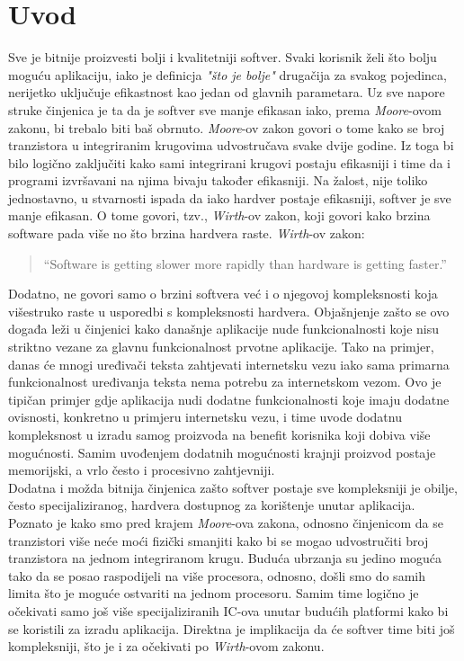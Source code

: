 \chapter{Uvod}

Sve je bitnije proizvesti bolji i kvalitetniji softver. Svaki korisnik želi što bolju moguću aplikaciju, iako je definicja \textit{"što je bolje"} drugačija za svakog pojedinca, nerijetko uključuje efikastnost kao jedan od glavnih parametara. Uz sve napore struke činjenica je ta da je softver sve manje efikasan iako, prema \textit{Moore}-ovom zakonu\cite{mooresLaw}, bi trebalo biti baš obrnuto. \textit{Moore}-ov zakon govori o tome kako se broj tranzistora u integriranim krugovima udvostručava svake dvije godine. Iz toga bi bilo logično zaključiti kako sami integrirani krugovi postaju efikasniji i time da i programi izvršavani na njima bivaju također efikasniji. Na žalost, nije toliko jednostavno, u stvarnosti ispada da iako hardver postaje efikasniji, softver je sve manje efikasan. O tome govori, tzv., \textit{Wirth}-ov zakon, koji govori kako brzina software pada više no što brzina hardvera raste. \textit{Wirth}-ov zakon:
\begin{quote}
    ``Software is getting slower more rapidly than hardware is getting faster.''\cite{wirthsLaw}
\end{quote}
Dodatno, ne govori samo o brzini softvera već i o njegovoj kompleksnosti koja višestruko raste u usporedbi s kompleksnosti hardvera. Objašnjenje zašto se ovo događa leži u činjenici kako današnje aplikacije nude funkcionalnosti koje nisu striktno vezane za glavnu funkcionalnost prvotne aplikacije. Tako na primjer, danas će mnogi uređivači teksta zahtjevati internetsku vezu iako sama primarna funkcionalnost uređivanja teksta nema potrebu za internetskom vezom. Ovo je tipičan primjer gdje aplikacija nudi dodatne funkcionalnosti koje imaju dodatne ovisnosti, konkretno u primjeru internetsku vezu, i time uvode dodatnu kompleksnost u izradu samog proizvoda na benefit korisnika koji dobiva više mogućnosti. Samim uvođenjem dodatnih mogućnosti krajnji proizvod postaje memorijski, a vrlo često i procesivno zahtjevniji. \\ 

Dodatna i možda bitnija činjenica zašto softver postaje sve kompleksniji je obilje, često specijaliziranog, hardvera dostupnog za korištenje unutar aplikacija. Poznato je kako smo pred krajem \textit{Moore}-ova zakona, odnosno činjenicom da se tranzistori više neće moći fizički smanjiti kako bi se mogao udvostručiti broj tranzistora na jednom integriranom krugu. Buduća ubrzanja su jedino moguća tako da se posao raspodijeli na više procesora, odnosno, došli smo do samih limita što je moguće ostvariti na jednom procesoru. Samim time logično je očekivati samo još više specijaliziranih IC-ova unutar budućih platformi kako bi se koristili za izradu aplikacija. Direktna je implikacija da će softver time biti još kompleksniji, što je i za očekivati po \textit{Wirth}-ovom zakonu. \\ 

